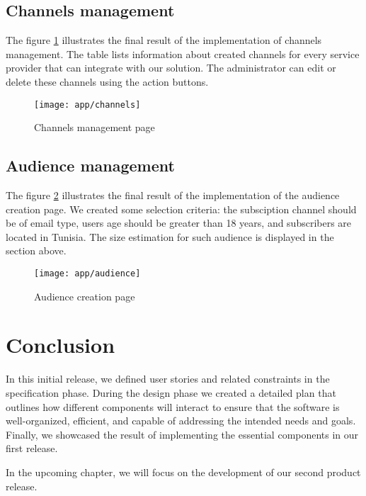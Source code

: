 \subsection{Channels management}
The figure \ref{ss-channels} illustrates the final result of the implementation of channels management. The table
lists information about created channels for every service provider that can integrate with our solution. The
administrator can edit or delete these channels using the action buttons.
\begin{figure}[hbt!]
    \centering
    \texttt{[image: app/channels]}
    \caption{Channels management page}
    \label{ss-channels}
\end{figure}

\subsection{Audience management}
The figure \ref{ss-audience} illustrates the final result of the implementation of the audience creation page.
We created some selection criteria: the subsciption channel should be of email type, users age should be greater
than 18 years, and subscribers are located in Tunisia. The size estimation for such audience is displayed in the section above.
\begin{figure}[hbt!]
    \centering
    \texttt{[image: app/audience]}
    \caption{Audience creation page}
    \label{ss-audience}
\end{figure}


\section*{Conclusion}

In this initial release, we defined user stories and related constraints in the specification phase.
During the design phase we created a detailed plan that outlines how different components will interact to
ensure that the software is well-organized, efficient, and capable of addressing the intended needs and
goals. Finally, we showcased the result of implementing the essential components in our first release.

\noindent In the upcoming chapter, we will focus on the development of our second product release.